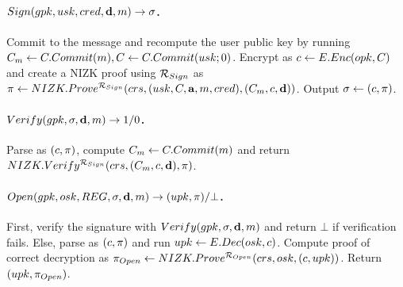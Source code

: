 \iffalse

\todo{This is not consistent with the $\langle \SBCMCom,\SBCMSign \rangle$
  definition...}
  
\begin{itemize}
\item \underline{User}: Commit to the user secret key by running $\Ccom \gets
  \CCommit(\usk)$. Generate proof $\NIZKproof \gets
  \NIZKProve^{\NIZKRel_{\Issue}}(\NIZKcrs,\usk,\Ccom)$. Send $(\Ccom,
  \NIZKproof)$ to the issuer.
\item \underline{Issuer}: Run $\NIZKVerify^{\NIZKRel_{\Issue}}(\NIZKcrs,
  \C,\NIZKproof)$, and return $\bot$ if it fails. Else, create the credential
  by computing $\SBCMsig \gets \SBCMSign(\isk,\C,\attrs)$. Send \SBCMsig to the
  user, and output $\utrans \gets (\C,\SBCMsig,\attrs,\NIZKproof)$.
\item \underline{User}: Check the signature by running $\SBCMVerify(\ipk,
  \SBCMsig,\attrs \cup \lbrace \usk \rbrace)$, and return $\bot$ if
  verification fails. Otherwise, return $\cred \gets \SBCMsig$.
\end{itemize}
\fi

\paragraph{$Sign(gpk,usk,cred,\mathbf{d},m) \rightarrow \sigma$.} %
Commit to the message and recompute the user public key by running
$C_{m} \gets C.Commit(m), C \gets C.Commit(usk; 0)$.
Encrypt \Ccom as $c \gets E.Enc(opk,C)$ and create a NIZK proof using
$\mathcal{R}_{Sign}$ as $\pi \gets NIZK.Prove^{\mathcal{R}_{Sign}}
(crs,(usk,C,\mathbf{a},m,cred),
(C_{m},c,\mathbf{d}))$. Output $\sigma \gets (c,\pi)$.

\paragraph{$Verify(gpk,\sigma,\mathbf{d},m) \rightarrow 1/0$.} %
Parse \sig as $(c,\pi)$, compute $C_{m} \gets C.Commit(m)$ and
return $NIZK.Verify^{\mathcal{R}_{Sign}}(crs,(C_{m},c,\mathbf{d}),
\pi)$.

\paragraph{$\Open(\gpk,\osk,\trans,\sig,\dattrs,\msg)
  \rightarrow (\upk,\oproof)/\bot$.} %
First, verify the signature with $Verify(gpk,\sigma,\mathbf{d},m)$ and
return $\bot$ if verification fails. Else, parse \sig as $(c,\pi)$
and run $upk \gets E.Dec(osk,c)$. Compute proof of correct decryption
as $\pi_{Open} \gets NIZK.Prove^{\mathcal{R}_{Open}}(crs,osk,(c,
upk))$. Return $(upk,\pi_{Open})$.

